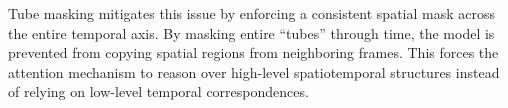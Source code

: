 Tube masking mitigates this issue by enforcing a consistent spatial mask across the
entire temporal axis. By masking entire ``tubes'' through time, the model is prevented
from copying spatial regions from neighboring frames. This forces the attention
mechanism to reason over high-level spatiotemporal structures instead of relying
on low-level temporal correspondences.
